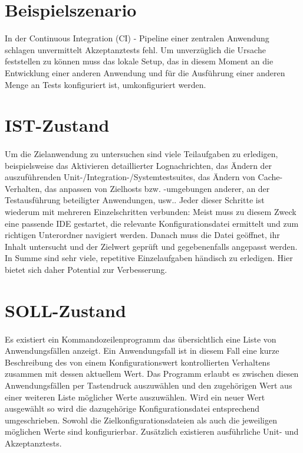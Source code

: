 \documentclass[a4paper,11pt]{article}
\begin{document}
\section{Beispielszenario}
In der Continuous Integration (CI) - Pipeline einer zentralen Anwendung schlagen
unvermittelt Akzeptanztests fehl. Um unverzüglich die Ursache feststellen zu
können muss das lokale Setup, das in diesem Moment an die Entwicklung einer
anderen Anwendung und für die Ausführung einer anderen Menge an Tests
konfiguriert ist, umkonfiguriert werden.

\section{IST-Zustand}
\paragraph{}
Um die Zielanwendung zu untersuchen sind viele Teilaufgaben zu erledigen,
beispielsweise das Aktivieren detaillierter Lognachrichten, das Ändern der
auszuführenden Unit-/Integration-/Systemtestsuites, das Ändern von Cache-Verhalten,
das anpassen von Zielhosts bzw. -umgebungen anderer, an der Testausführung
beteiligter Anwendungen, usw.. Jeder dieser Schritte ist wiederum mit mehreren
Einzelschritten verbunden: Meist muss zu diesem Zweck eine passende IDE gestartet,
die relevante Konfigurationsdatei ermittelt und zum richtigen Unterordner navigiert
werden. Danach muss die Datei geöffnet, ihr Inhalt untersucht und der Zielwert
geprüft und gegebenenfalls angepasst werden. In Summe sind sehr viele,
repetitive Einzelaufgaben händisch zu erledigen. Hier bietet sich daher Potential
zur Verbesserung.

\section{SOLL-Zustand}
\paragraph{}
Es existiert ein Kommandozeilenprogramm das übersichtlich eine Liste von
Anwendungsfällen anzeigt. Ein Anwendungsfall ist in diesem Fall eine kurze
Beschreibung des von einem Konfigurationswert kontrollierten Verhaltens zusammen
mit dessen aktuellem Wert. Das Programm erlaubt es zwischen diesen
Anwendungsfällen per Tastendruck auszuwählen und den zugehörigen Wert aus einer
weiteren Liste möglicher Werte auszuwählen. Wird ein neuer Wert ausgewählt so
wird die dazugehörige Konfigurationsdatei entsprechend umgeschrieben. Sowohl die
Zielkonfigurationsdateien als auch die jeweiligen möglichen Werte sind
konfigurierbar. Zusätzlich existieren ausführliche Unit- und Akzeptanztests.
\end{document}
